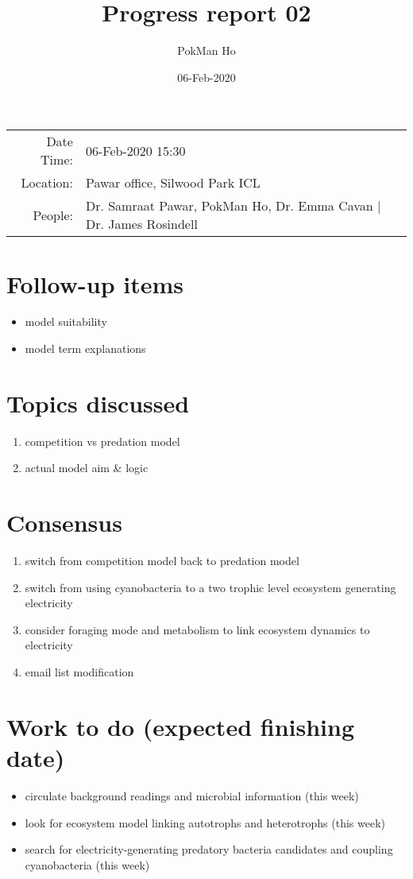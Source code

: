 \documentclass[a4paper,11pt]{article}
\title{Progress report 02}
\author{PokMan Ho}
\date{06-Feb-2020}
\begin{document}
    \maketitle
    
    \begin{tabular}{rl}
        Date Time: & 06-Feb-2020 15:30 \\
        Location: & Pawar office, Silwood Park ICL \\
        People: & Dr. Samraat Pawar, PokMan Ho, Dr. Emma Cavan | Dr. James Rosindell \\
    \end{tabular}
    \section{Follow-up items}
    \begin{itemize}
        \item model suitability
        \item model term explanations
    \end{itemize}
    \section{Topics discussed}
    \begin{enumerate}
        \item competition vs predation model
        \item actual model aim \& logic
    \end{enumerate}
    \section{Consensus}
    \begin{enumerate}
        \item switch from competition model back to predation model
        \item switch from using cyanobacteria to a two trophic level ecosystem generating electricity
        \item consider foraging mode and metabolism to link ecosystem dynamics to electricity
        \item email list modification
    \end{enumerate}
    \section{Work to do (expected finishing date)}
    \begin{itemize}
        \item circulate background readings and microbial information (this week)
        \item look for ecosystem model linking autotrophs and heterotrophs (this week)
        \item search for electricity-generating predatory bacteria candidates and coupling cyanobacteria (this week)
    \end{itemize}
\end{document}
